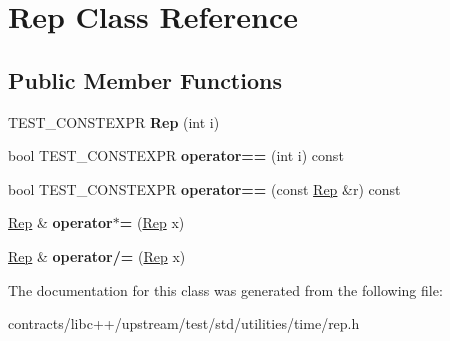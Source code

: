\hypertarget{class_rep}{}\section{Rep Class Reference}
\label{class_rep}
\subsection*{Public Member Functions}
\begin{DoxyCompactItemize}
\item 
\mbox{\label{class_rep_a1f231a9e4ff469f0d56cc4b242c604c1}} 
T\+E\+S\+T\+\_\+\+C\+O\+N\+S\+T\+E\+X\+PR {\bfseries Rep} (int i)
\item 
\mbox{\label{class_rep_a50d36fdf1df343cb3cdc78c999412fd8}} 
bool T\+E\+S\+T\+\_\+\+C\+O\+N\+S\+T\+E\+X\+PR {\bfseries operator==} (int i) const
\item 
\mbox{\label{class_rep_ac1ca9f830cc7b6ba4b62e84cad002ad7}} 
bool T\+E\+S\+T\+\_\+\+C\+O\+N\+S\+T\+E\+X\+PR {\bfseries operator==} (const \mbox{\hyperlink{class_rep}{Rep}} \&r) const
\item 
\mbox{\label{class_rep_abba40d925824f0f24863a0b155ac7eef}} 
\mbox{\hyperlink{class_rep}{Rep}} \& {\bfseries operator$\ast$=} (\mbox{\hyperlink{class_rep}{Rep}} x)
\item 
\mbox{\label{class_rep_adb3a0fc7f16ce130f4d63a6c20de7ae3}} 
\mbox{\hyperlink{class_rep}{Rep}} \& {\bfseries operator/=} (\mbox{\hyperlink{class_rep}{Rep}} x)
\end{DoxyCompactItemize}


The documentation for this class was generated from the following file\+:\begin{DoxyCompactItemize}
\item 
contracts/libc++/upstream/test/std/utilities/time/rep.\+h\end{DoxyCompactItemize}
